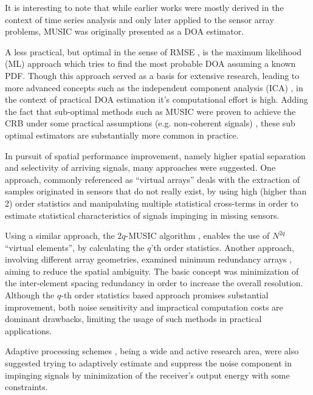 It is interesting to note that while earlier works were mostly derived in the context of time series analysis and only later applied to the sensor array problems, MUSIC was originally presented as a DOA estimator.
\par A less practical, but optimal in the sense of RMSE \cite{krim1996two}, is the maximum likelihood (ML) approach which tries to find the most probable DOA assuming a known PDF.
Though this approach served as a basis for extensive research, leading to more advanced concepts such as the independent component analysis (ICA) \cite{hyvarinen1999survey}, in the context of practical DOA estimation it's computational effort is high.
Adding the fact that sub-optimal methods such as MUSIC were proven to achieve the CRB under some practical assumptions (e.g. non-coherent signals) \cite{stoica1989music}, these sub optimal estimators are substantially more common in practice. 
\par In pursuit of spatial performance improvement, namely higher spatial separation and selectivity of arriving signals, many approaches were suggested.  
One approach, commonly referenced as ``virtual arrays'' \cite{pal2010nested,chevalier2005virtual,dogan1995applications} deals with the extraction of samples originated in sensors that do not really exist, by using high (higher than 2) order statistics and manipulating multiple statistical cross-terms in order to estimate statistical characteristics of signals impinging in missing sensors.
\par Using a similar approach, the $2q$-MUSIC algorithm \cite{chevalier2006high}, enables the use of $N^{2q}$ ``virtual elements'', by calculating the $q$'th order statistics.
Another approach, involving different array geometries, examined minimum redundancy arrays \cite{moffet1968minimum,pillai1985new,pillai1987statistical,Kupershtein2013}, aiming to reduce the spatial ambiguity. The basic concept was minimization of the inter-element spacing redundancy in order to increase the overall resolution.
Although the $q$-th order statistics based approach promises substantial improvement, both noise sensitivity and impractical computation costs are dominant drawbacks, limiting the usage of such methods in practical applications.   
\par Adaptive processing schemes \cite{frost1972algorithm,manolakis2000statistical}, being a wide and active research area, were also suggested trying to adaptively estimate and suppress the noise component in impinging signals by minimization of the receiver's output energy with some constraints.

